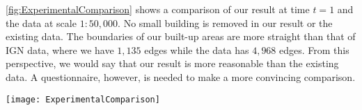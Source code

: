 


\fig\ref{fig:ExperimentalComparison} shows a comparison of 
our result at time $t=1$
and the data at scale $1:50{,}000$.
No small building is removed in our result or the existing data.
The boundaries of our built-up areas are more straight than that of IGN data, 
where we have $1{,}135$ edges while the data has $4{,}968$ edges.
From this perspective, we would say that our result is 
more reasonable than the existing data.
A questionnaire, however, is needed to make a more convincing comparison.




\begin{figure*}[tb]
	\centering
	\texttt{[image: ExperimentalComparison]}
	\caption{A comparison of our result and the existing data at scale 
		$1:50{,}000$.
		The brighter gray polygons represent the original buildings.
		The darker gray polygons are our result at time $t=1$.
		The gray polylines represent the data of the built-up areas at scale 
		$1:50{,}000$ from IGN, where some built-up areas are split because some 
		streets cross these areas.
	}
	\label{fig:ExperimentalComparison}
\end{figure*}


